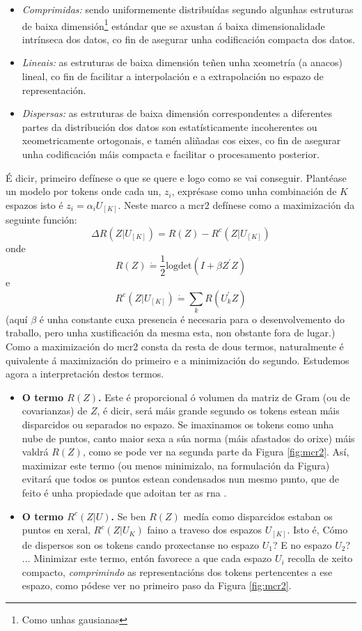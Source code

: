 \begin{itemize}
				\item \emph{\textcolor{udcpink}{Comprimidas:}} sendo uniformemente distribuídas segundo algunhas estruturas de baixa dimensión\footnote{Como unhas gausianas} estándar que se axustan á baixa dimensionalidade intrínseca dos datos, co fin de asegurar unha codificación compacta dos datos.
				\item \emph{\textcolor{ficblue}{Lineais:}} as estruturas de baixa dimensión teñen unha xeometría (a anacos) lineal, co fin de facilitar a interpolación e a extrapolación no espazo de representación.
				\item \emph{\textcolor{udcgray}{Dispersas:}} as estruturas de baixa dimensión correspondentes a diferentes partes da distribución dos datos son estatísticamente incoherentes ou xeometricamente ortogonais, e tamén aliñadas cos eixes, co fin de asegurar unha codificación máis compacta e facilitar o procesamento posterior.
\end{itemize}

É dicir, primeiro defínese o que se quere e logo como se vai conseguir. Plantéase un modelo por \glspl{token} onde cada un, $z_i$, exprésase como unha combinación de $K$ espazos isto é $z_i = \alpha_i U_{[K]}$. Neste marco  a \acrshort{mcr2} defínese como a maximización da seguinte función: \[\Delta R (Z | U_{[K]}) = R(Z) - R^{c}(Z | U_{[K]})\] onde \[R(Z) \dot{=} \frac{1}{2} \text{logdet}(I+ \beta Z^{'}Z)\] e \[R^{c}(Z | U_{[K]}) \dot{=} \sum_{k}R(U^{'}_{k}Z)\] (aquí $\beta$ é unha constante cuxa presencia é necesaria para o desenvolvemento do traballo, pero unha xustificación da mesma esta, non obstante fora de lugar.) Como a maximización do \acrshort{mcr2} consta da resta de dous termos, naturalmente é quivalente á maximización do primeiro e a minimización do segundo. Estudemos agora a interpretación destos termos.
\begin{itemize}
				\item \textbf{O termo $R(Z)$.} Este é proporcional ó volumen da matriz de Gram (ou de covarianzas) de $Z$, é dicir, será máis grande segundo os \glspl{token} estean máis disparcidos ou separados no espazo. Se imaxinamos os \glspl{token} como unha nube de puntos, canto maior sexa a súa norma (máis afastados do orixe) máis valdrá $R(Z)$, como se pode ver na segunda parte da Figura \ref{fig:mcr2}. Así, maximizar este termo (ou menos minimizalo, na formulación da Figura) evitará que todos os puntos estean condensados nun mesmo punto, que de feito é unha propiedade que adoitan ter as \acrshort{rna} \cite{neural_collapse}.
				\item \textbf{O termo $R^c(Z|U)$.} Se ben $R(Z)$ medía como disparcidos estaban os puntos en xeral, $R^c(Z|U_{K})$ faino a traveso dos espazos $U_{[K]}$. Isto é, Cómo de dispersos son os \glspl{token} cando proxectanse no espazo $U_1$? E no espazo $U_2$? $\dots$ Minimizar este termo, entón favorece a que cada espazo $U_i$ recolla de xeito compacto, \emph{comprimindo} as representacións dos \glspl{token} pertencentes a ese espazo, como pódese ver no primeiro paso da Figura \ref{fig:mcr2}.
\end{itemize}

